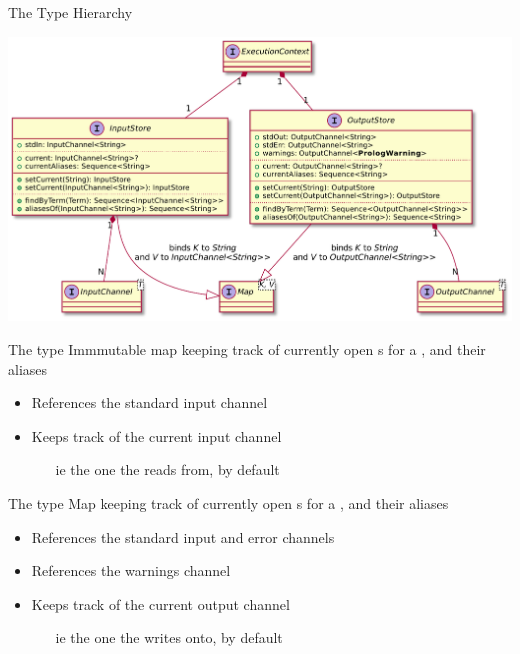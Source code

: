 \documentclass[handout]{beamer}
\begin{document}
\begin{frame}[allowframebreaks]{The  Type Hierarchy}

    \begin{center}
        \includegraphics[width=.8\linewidth]{img/channels+stores.pdf}
    \end{center}

    \framebreak

    \begin{block}{The  type}
        Immmutable map keeping track of currently open s for a , and their aliases
        \begin{itemize}
            \item References the \alert{standard} input channel
            \item Keeps track of the \alert{current} input channel
            \begin{itemize}
                \item[ie] the one the  reads from, by default
            \end{itemize}
        \end{itemize}
    \end{block}

    \framebreak

    \begin{block}{The  type}
        Map keeping track of currently open s for a , and their aliases
        \begin{itemize}
            \item References the \alert{standard} input and error channels
            \item References the \alert{warnings} channel
            \item Keeps track of the \alert{current} output channel
            \begin{itemize}
                \item[ie] the one the  writes onto, by default
            \end{itemize}
        \end{itemize}
    \end{block}


\end{frame}
\end{document}
